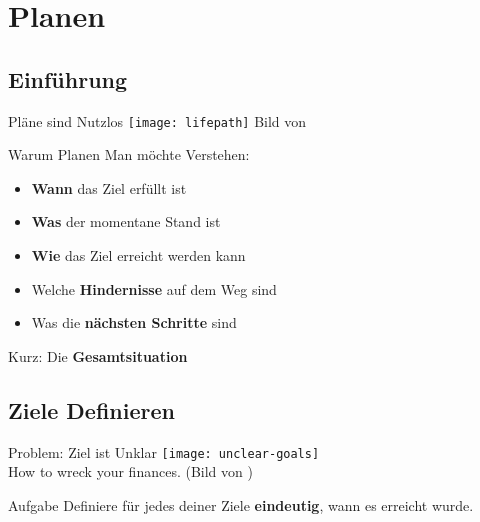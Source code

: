 \section{Planen}


\subsection{Einführung}

\begin{frame}[c]{Pläne sind Nutzlos}
    \normalsize
    \texttt{[image: lifepath]}
    Bild von \cite{lifepath-pic}
\end{frame}


\begin{frame}[c]{Warum Planen}
    \large
    Man möchte Verstehen:
    \begin{itemize}[<+(1)->]
        \item \textbf{Wann} das Ziel erfüllt ist
        \item \textbf{Was} der momentane Stand ist
        \item \textbf{Wie} das Ziel erreicht werden kann
        \item Welche \textbf{Hindernisse} auf dem Weg sind
        \item Was die \textbf{nächsten Schritte} sind
    \end{itemize}
    \pause
    Kurz: Die \textbf{Gesamtsituation}
\end{frame}


\subsection{Ziele Definieren}


\begin{frame}[c]{Problem: Ziel ist Unklar}
    \normalsize
    \texttt{[image: unclear-goals]} \\
    How to wreck your finances. (Bild von \cite{unclear-goals-pic})
\end{frame}


\begin{frame}[c]%
    \large
    \begin{block}{Aufgabe}
        Definiere für jedes deiner Ziele \textbf{eindeutig}, wann es erreicht wurde.
    \end{block}
\end{frame}

